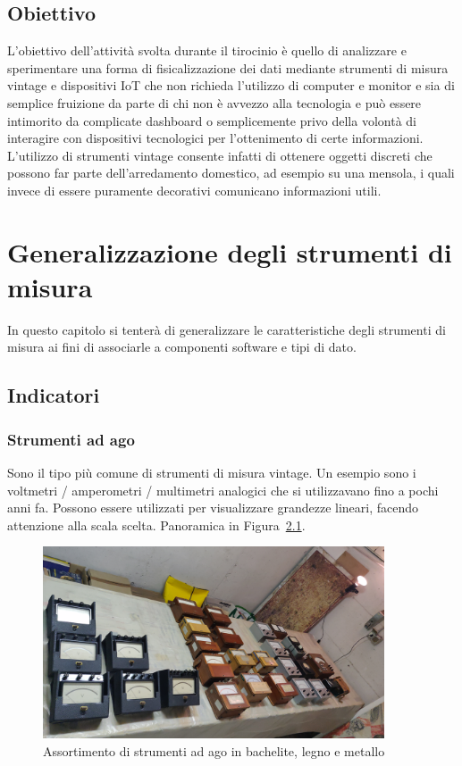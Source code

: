 \documentclass[12pt,a4paper]{report}
\begin{document}

\section{Obiettivo}
L'obiettivo dell'attività svolta durante il tirocinio è quello di analizzare e sperimentare una forma di fisicalizzazione
dei dati mediante strumenti di misura vintage e dispositivi IoT che non richieda l'utilizzo di computer e monitor e sia di semplice fruizione
da parte di chi non è avvezzo alla tecnologia e può essere intimorito da complicate dashboard o semplicemente privo della volontà
di interagire con dispositivi tecnologici per l'ottenimento di certe informazioni. L'utilizzo di strumenti vintage consente infatti di ottenere
oggetti discreti che possono far parte dell'arredamento domestico, ad esempio su una mensola, i quali invece di essere puramente
decorativi comunicano informazioni utili.



\chapter{Generalizzazione degli strumenti di misura}
In questo capitolo si tenterà di generalizzare le caratteristiche degli strumenti di misura ai fini di associarle a componenti software e tipi di dato.
\section{Indicatori}
\subsection{Strumenti ad ago}
Sono il tipo più comune di strumenti di misura vintage. Un esempio sono i voltmetri / amperometri / multimetri analogici che si utilizzavano
fino a pochi anni fa. Possono essere utilizzati per visualizzare grandezze lineari, facendo attenzione alla scala scelta.
Panoramica in Figura~\ref{fig:strumentiago}.

\begin{figure}[h]
  \centering
  \includegraphics[width=0.9\textwidth]{strumentiago}
  \caption{Assortimento di strumenti ad ago in bachelite, legno e metallo}
  \label{fig:strumentiago}
\end{figure}
\end{document}
